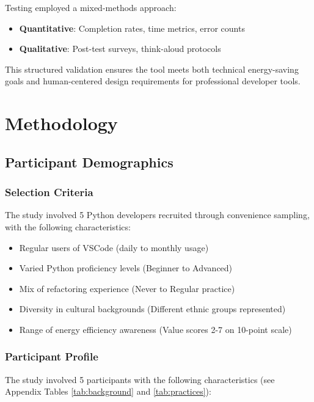 \documentclass{article}
\begin{document}
Testing employed a mixed-methods approach:
\begin{itemize}
    \item \textbf{Quantitative}: Completion rates, time metrics, error counts
    \item \textbf{Qualitative}: Post-test surveys, think-aloud protocols
\end{itemize}

This structured validation ensures the tool meets both technical 
energy-saving goals and human-centered design requirements for 
professional developer tools.


\newpage
\section{Methodology}
\subsection{Participant Demographics}
\subsubsection{Selection Criteria}
The study involved 5 Python developers recruited through convenience sampling, with the following characteristics:

\begin{itemize}
    \item Regular users of VSCode (daily to monthly usage)
    \item Varied Python proficiency levels (Beginner to Advanced)
    \item Mix of refactoring experience (Never to Regular practice)
    \item Diversity in cultural backgrounds (Different ethnic groups represented)
    \item Range of energy efficiency awareness (Value scores 2-7 on 10-point scale)
\end{itemize}

\subsubsection{Participant Profile}
The study involved 5 participants with the following characteristics (see Appendix Tables \ref{tab:background} and \ref{tab:practices}):
\end{document}
